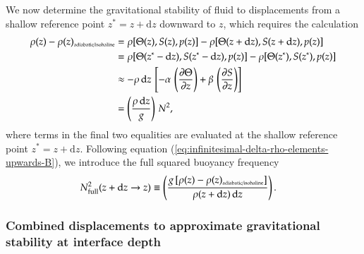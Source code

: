 We now determine the gravitational stability of fluid to displacements
from a shallow reference point $z^{*} = z + \mathrm{d}z$ downward to
$z$, which requires the calculation
\begin{equation}
\begin{split}
\rho(z)  - \rho(z)_{\mbox{\tiny adiabatic/isohaline}}  
&= 
 \rho[ \Theta(z), S(z), p(z)]
-
\rho[ \Theta(z+\mathrm{d}z), S(z+\mathrm{d}z), p(z)]
\\
 &=
 \rho[ \Theta(z^{*}-\mathrm{d}z), S(z^{*}-\mathrm{d}z), p(z)]
-
\rho[ \Theta(z^{*}), S(z^{*}), p(z)]
\\
&\approx 
 -\rho \, \mathrm{d}z \, \left[ 
   -\alpha \, \left( \frac{\partial \Theta}{\partial z} \right )
  + \beta \, \left( \frac{\partial S}{\partial z} \right) \right]
 \\
&=
\left( \frac{\rho \, \mathrm{d}z}{g} \right) \, N^{2},
\end{split}
\label{eq:infinitesimal-delta-rho-elements-downward}
\end{equation}
where terms in the final two equalities are evaluated at the shallow
reference point $z^{*} = z + \mathrm{d}z$.  Following equation
(\ref{eq:infinitesimal-delta-rho-elements-upwards-B}), we introduce the
full squared buoyancy frequency
\begin{equation}
\begin{split}
 N^{2}_{\mbox{\scriptsize full}}(z +\mathrm{d}z \rightarrow z) &\equiv 
 \left( \frac{g \, [ \rho(z)  - \rho(z)_{\mbox{\tiny adiabatic/isohaline}} ] } {\rho(z+\mathrm{d}z) \, \mathrm{d}z} \right).
\end{split}
\label{eq:infinitesimal-delta-rho-elements-downwards}
\end{equation}



\subsubsection{Combined displacements to approximate gravitational stability at
  interface depth}

